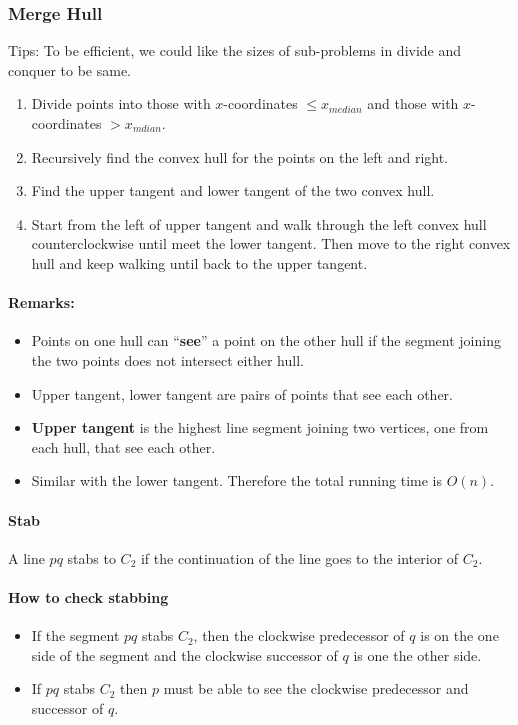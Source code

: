 \documentclass[en,hazy,blue,screen,14pt]{elegantnote}
\begin{document}
\subsubsection{Merge Hull}
Tips: To be efficient, we could like the sizes of sub-problems in divide and 
conquer to be same.
\begin{enumerate}
 \item Divide points into those with $x$-coordinates $\le x_{median}$ and those 
with $x$-coordinates $> x_{mdian}$.
\item Recursively find the convex hull for the points on the left and right.
\item Find the upper tangent and lower tangent of the two convex hull. 
\item Start from the left of upper tangent and walk through the left convex 
hull counterclockwise until meet the lower tangent. Then move to the right 
convex hull and keep walking until back to the upper tangent.
\end{enumerate}

\paragraph{Remarks:}
\begin{itemize}
\item Points on one hull can ``\textbf{see}'' a point on the other hull if the 
segment joining the two points does not intersect either hull.
\item Upper tangent, lower tangent are pairs of points that see each other.
\item \textbf{Upper tangent}  is the highest line segment joining two vertices, 
one from each hull, that see each other.
\item Similar with the lower tangent. Therefore the total running time is 
$O(n)$.
\end{itemize}

\paragraph{Stab}
A line $pq$ stabs to $C_2$ if the continuation of the line goes to 
the interior of $C_2$.

\paragraph{How to check stabbing}
\begin{itemize}
\item If the segment $pq$ stabs $C_2$, then the clockwise predecessor of $q$ 
is on the one side of the segment and the clockwise successor of $q$ is one the 
other side.
\item If $pq$ stabs $C_2$ then $p$ must be able to see the clockwise 
predecessor and successor of $q$.
\end{itemize}
\end{document}
